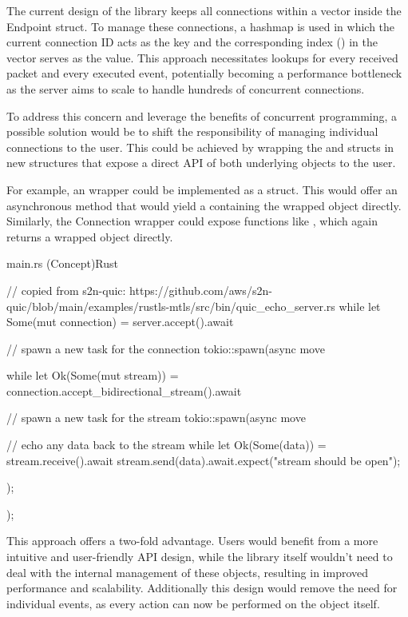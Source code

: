The current design of the library keeps all connections within a vector inside the Endpoint struct. To manage these connections,
a hashmap is used in which the current connection ID acts as the key and the corresponding index () in the
vector serves as the value. This approach necessitates lookups for every received packet and every executed event, potentially
becoming a performance bottleneck as the server aims to scale to handle hundreds of concurrent connections.

To address this concern and leverage the benefits of concurrent programming, a possible solution would be to shift the responsibility
of managing individual connections to the user. This could be achieved by wrapping the  and 
structs in new structures that expose a direct API of both underlying objects to the user.

For example, an  wrapper could be implemented as a  struct. This  would offer
an asynchronous  method that would yield a  containing the wrapped 
object directly. Similarly, the Connection wrapper could expose functions like , which again returns
a wrapped  object directly.

\begin{codeblock}{main.rs (Concept)}{Rust}
    \begin{rustcode}
        // copied from s2n-quic: https://github.com/aws/s2n-quic/blob/main/examples/rustls-mtls/src/bin/quic_echo_server.rs
        while let Some(mut connection) = server.accept().await {
            // spawn a new task for the connection
            tokio::spawn(async move {

                while let Ok(Some(mut stream)) = connection.accept_bidirectional_stream().await {
                    // spawn a new task for the stream
                    tokio::spawn(async move {

                        // echo any data back to the stream
                        while let Ok(Some(data)) = stream.receive().await {
                            stream.send(data).await.expect("stream should be open");
                        }
                    });
                }
            });
        }
    \end{rustcode}
    \label{example_lib_redesign}
\end{codeblock}

This approach offers a two-fold advantage. Users would benefit from a more intuitive and user-friendly API design, while the library
itself wouldn't need to deal with the internal management of these objects, resulting in improved performance and scalability.
Additionally this design would remove the need for individual events, as every action can now be performed on the object itself.
